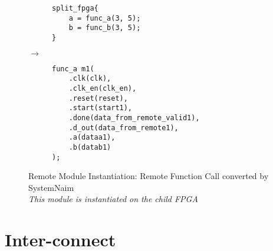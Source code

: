 \begin{figure}[H]
\centering
\begin{subfigure}{0.32\textwidth}
    \centering
    \begin{verbatim}
split_fpga{
    a = func_a(3, 5);
    b = func_b(3, 5);
}
\end{verbatim}
\end{subfigure}%
{\LARGE$\rightarrow$}%
\begin{subfigure}{0.58\textwidth}
    \begin{verbatim}
func_a m1(
    .clk(clk),
    .clk_en(clk_en),
    .reset(reset),
    .start(start1),
    .done(data_from_remote_valid1),
    .d_out(data_from_remote1),
    .a(dataa1),
    .b(datab1)
);
    \end{verbatim}
\end{subfigure}
\caption{Remote Module Instantiation: Remote Function Call converted by SystemNaim \\ \textit{This module is instantiated on the child FPGA}}
\label{sn:rmt_func_call_slv_mdl}
\end{figure}
        
    

\section{Inter-connect}

